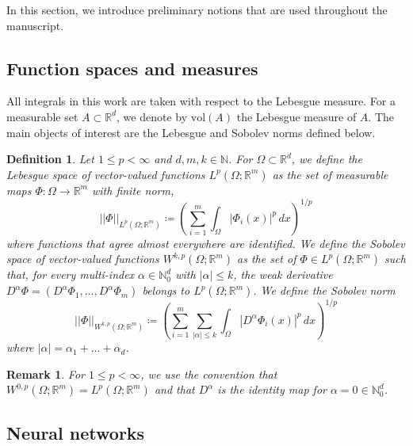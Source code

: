 \documentclass[a4paper, 11pt]{article}
\newtheorem{definition}[theorem]{Definition}
\newtheorem{remark}[theorem]{Remark}
\newcommand{\vol}{\mathrm{vol}}
\begin{document}
	In this section, we introduce preliminary notions that are used throughout the manuscript.

	
	\subsection{Function spaces and measures}
	All integrals in this work are taken with respect to the Lebesgue measure.
	For a measurable set $A \subset \mathbb{R}^d$, we denote by $\vol(A)$ the Lebesgue measure of $A$.
	The main objects of interest are the Lebesgue and Sobolev norms defined below.
	
	\begin{definition}\label{def:lebesgueSob}
		Let $1 \leq p < \infty$ and $d, m, k \in \mathbb{N}$. For $\Omega\subset \mathbb{R}^d$, we define the Lebesgue space of vector-valued functions $L^p(\Omega; \mathbb{R}^m)$ as the set of measurable maps $\Phi: \Omega \to \mathbb{R}^m$
		with finite norm,
		\begin{equation}
			\label{def: sobolev norm}
			||\Phi ||_{L^p(\Omega; \mathbb{R}^m)} \coloneqq \left( \sum_{i=1}^m \int_\Omega |\Phi_i(x)|^p \,dx\right)^{1/p}
		\end{equation}
		where functions that agree almost everywhere are identified.
		We define the Sobolev space of vector-valued functions $W^{k,p}(\Omega; \mathbb{R}^m)$ as the set of $\Phi \in L^p(\Omega; \mathbb{R}^m)$ such that, for every multi-index $\alpha \in \mathbb{N}_0^d$ with $|\alpha| \leq k$, the weak derivative $D^\alpha\Phi=(D^\alpha\Phi_1,\dotsc, D^\alpha\Phi_m)$ belongs to $L^p(\Omega; \mathbb{R}^m)$. We define the Sobolev norm
		\begin{equation}
			||\Phi||_{W^{k,p}(\Omega; \mathbb{R}^m)}\coloneqq\left(\sum_{i=1}^m  \sum_{|\alpha|\leq k}\int_\Omega |D^\alpha\Phi_i(x)|^p\, dx\right)^{1/p}
		\end{equation}
		where $|\alpha|=\alpha_1 + \dots + \alpha_d$.
	\end{definition}
	
	\begin{remark}
		For $1 \leq p < \infty$, we use the convention that $W^{0,p}(\Omega; \mathbb{R}^m)=L^p(\Omega; \mathbb{R}^m)$ and that $D^\alpha$ is the identity map for $\alpha = 0 \in \mathbb{N}_0^d$.
	\end{remark}
	
	
	\subsection{Neural networks}
	
\end{document}
